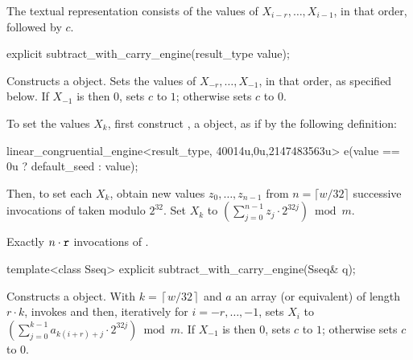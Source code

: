 \pnum
The textual representation%
%
consists of the values of
 $X_{i-r}, \dotsc, X_{i-1}$,
in that order, followed by $c$.


%
\begin{itemdecl}
explicit subtract_with_carry_engine(result_type value);
\end{itemdecl}

\begin{itemdescr}
\pnum\effects Constructs a  object.
 Sets the values of
 $X_{-r}, \dotsc, X_{-1}$,
 in that order, as specified below.
 If $X_{-1}$ is then $0$,
 sets $c$ to $1$;
 otherwise sets $c$ to $0$.

 To set the values $X_k$,
 first construct , a  object,
 as if by the following definition:
\begin{codeblock}
linear_congruential_engine<result_type,
                          40014u,0u,2147483563u> e(value == 0u ? default_seed : value);
\end{codeblock}
 Then, to set each $X_k$,
 obtain new values $z_0, \dotsc, z_{n-1}$
 from $n = \lceil w/32 \rceil$ successive invocations
 of  taken modulo $2^{32}$.
 Set $X_k$ to $\left( \sum_{j=0}^{n-1} z_j \cdot 2^{32j}\right) \bmod m$.

\pnum\complexity Exactly $n \cdot \texttt{r}$ invocations
 of .
\end{itemdescr}



%
\begin{itemdecl}
template<class Sseq> explicit subtract_with_carry_engine(Sseq& q);
\end{itemdecl}

\begin{itemdescr}
\pnum\effects Constructs a  object.
 With
 $k = \left\lceil w / 32 \right\rceil$
 and $a$ an array (or equivalent)
 of length $r \cdot k$,
 invokes 
 and then, iteratively for $i = -r, \dotsc, -1$,
 sets $X_i$
 to $ \left(\sum_{j=0}^{k-1}a_{k(i+r)+j} \cdot 2^{32j} \right) \bmod m $.
 If $X_{-1}$ is then $0$,
 sets $c$ to $1$;
 otherwise sets $c$ to $0$.
\end{itemdescr}


